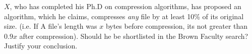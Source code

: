 $X$, who has completed his Ph.D on compression algorithms, has
proposed an algorithm, which he claims, compresses {\em any} file by
at least 10\%  of its original size. (i.e. If A file's length was $x$
bytes before compression, its not greater than $0.9x$ after
compression). Should he be shortlisted in the Brown Faculty search?
Justify your conclusion.

